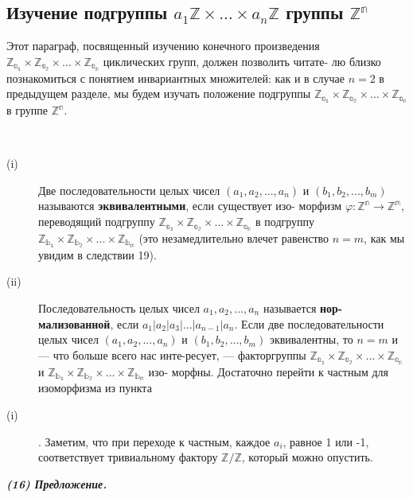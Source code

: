 \subsection{Изучение подгруппы $a_1\mathbb{Z} \times ... \times a_n\mathbb{Z}$ группы $\mathbb{Z^n}$}
\noindent Этот параграф, посвященный изучению конечного произведения \linebreak $\mathbb{Z_{a_1}} \times \mathbb{Z_{a_2}} \times ... \times \mathbb{Z_{a_n}}$ циклических групп, должен позволить читате- \linebreak лю близко познакомиться с понятием инвариантных множителей: как \linebreak и в случае $n = 2$ в предыдущем разделе, мы будем изучать положение подгруппы $\mathbb{Z_{a_1}} \times \mathbb{Z_{a_2}} \times ... \times \mathbb{Z_{a_n}}$ в группе $\mathbb{Z^n}$.

\begin{determ}
\
 \begin{description} \item[(i)]  Две последовательности целых чисел $(a_1, a_2, ..., a_n)$ и \linebreak $(b_1, b_2, ..., b_m)$ называются \textbf{эквивалентными}, если существует изо- \linebreak морфизм $\varphi : \mathbb{Z^n} \to \mathbb{Z^m}$, переводящий подгруппу $\mathbb{Z_{a_1}} \times \mathbb{Z_{a_2}} \times ... \times \mathbb{Z_{a_n}}$ в \linebreak подгруппу $\mathbb{Z_{b_1}} \times \mathbb{Z_{b_2}} \times ... \times \mathbb{Z_{b_m}}$ (это незамедлительно влечет равенство \linebreak $n = m$, как мы увидим в следствии 19).  
\item[(ii)] Последовательность целых чисел $a_1, a_2, ..., a_n$ называется \textbf{нор-} \linebreak \textbf{мализованной}, если $a_1 | a_2 | a_3 | ... | a_{n-1} | a_n$.   
Если две последовательности целых чисел $(a_1, a_2, ..., a_n)$ и \linebreak $(b_1, b_2, ..., b_m)$ эквивалентны, то $n = m$ и --- что больше всего нас инте-\linebreak ресует, --- факторгруппы $\mathbb{Z_{a_1}} \times \mathbb{Z_{a_2}} \times ... \times \mathbb{Z_{a_n}}$ и $\mathbb{Z_{b_1}} \times \mathbb{Z_{b_2}} \times ... \times \mathbb{Z_{b_m}}$ изо- \linebreak морфны. Достаточно перейти к частным для изоморфизма из пункта \linebreak \item[(i)] . Заметим, что при переходе к частным, каждое $a_i$, равное 1 или -1, \linebreak соответствует тривиальному фактору $\mathbb{Z} / \mathbb{Z}$, который можно опустить.

\end{description} 
\end{determ}
\emph{\textbf{(16) Предложение.}}

